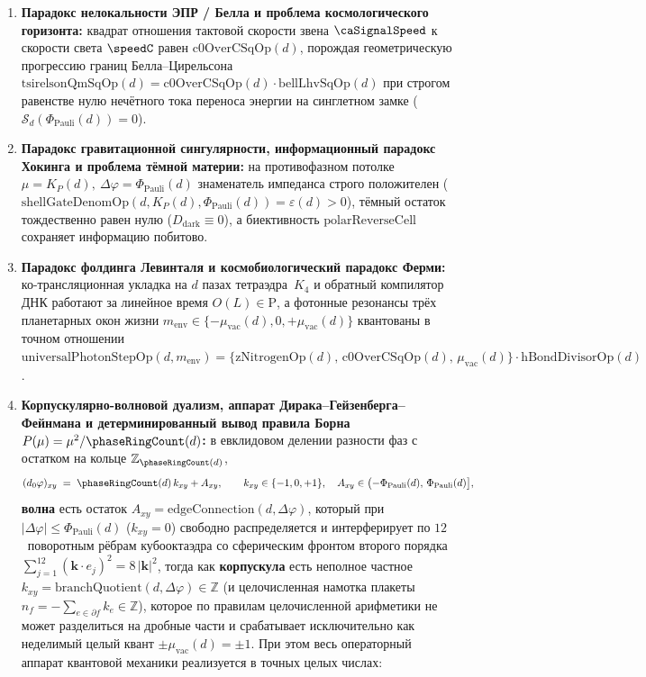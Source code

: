 \begin{theorem}
\begin{enumerate}[label=\textbf{(\roman*)},leftmargin=*]
\item \textbf{Парадокс нелокальности ЭПР / Белла и проблема космологического горизонта:}
  квадрат отношения тактовой скорости звена $\caSignalSpeed$ к скорости света $\speedC$ равен $\mathrm{c0OverCSqOp}(d)$, порождая геометрическую прогрессию границ Белла--Цирельсона $\mathrm{tsirelsonQmSqOp}(d) = \mathrm{c0OverCSqOp}(d)\cdot\mathrm{bellLhvSqOp}(d)$ при строгом равенстве нулю нечётного тока переноса энергии на синглетном замке ($\mathcal{S}_d(\Phi_{\mathrm{Pauli}}(d)) = 0$).
\item \textbf{Парадокс гравитационной сингулярности, информационный парадокс Хокинга и проблема тёмной материи:}
  на противофазном потолке $\mu=K_P(d),\ \Delta\varphi=\Phi_{\mathrm{Pauli}}(d)$ знаменатель импеданса строго положителен ($\mathrm{shellGateDenomOp}(d,K_P(d),\Phi_{\mathrm{Pauli}}(d)) = \varepsilon(d) > 0$), тёмный остаток тождественно равен нулю ($D_{\mathrm{dark}}\equiv 0$), а биективность $\mathrm{polarReverseCell}$ сохраняет информацию побитово.
\item \textbf{Парадокс фолдинга Левинталя и космобиологический парадокс Ферми:}
  ко-трансляционная укладка на $d$ пазах тетраэдра~$K_4$ и обратный компилятор ДНК работают за линейное время $O(L)\in\mathrm{P}$, а фотонные резонансы трёх планетарных окон жизни $m_{\mathrm{env}}\in\{-\mu_{\mathrm{vac}}(d),0,+\mu_{\mathrm{vac}}(d)\}$ квантованы в точном отношении $\mathrm{universalPhotonStepOp}(d,m_{\mathrm{env}}) = \{\mathrm{zNitrogenOp}(d),\,\mathrm{c0OverCSqOp}(d),\,\mu_{\mathrm{vac}}(d)\}\cdot\mathrm{hBondDivisorOp}(d)$.
\item \textbf{Корпускулярно-волновой дуализм, аппарат Дирака--Гейзенберга--Фейнмана и детерминированный вывод правила Борна $P(\mu)=\mu^2/\phaseRingCount(d)$:}
  в евклидовом делении разности фаз с остатком на кольце $\mathbb{Z}_{\phaseRingCount(d)}$,
  \[
    (d_0\varphi)_{xy} \;=\; \phaseRingCount(d)\,k_{xy} + A_{xy},\qquad
    k_{xy}\in\{-1,0,+1\},\quad A_{xy}\in\bigl(-\Phi_{\mathrm{Pauli}}(d),\,\Phi_{\mathrm{Pauli}}(d)\bigr],
  \]
  \textbf{волна} есть остаток $A_{xy} = \mathrm{edgeConnection}(d,\Delta\varphi)$, который при $|\Delta\varphi|\le\Phi_{\mathrm{Pauli}}(d)$ ($k_{xy}=0$) свободно распределяется и интерферирует по $12$~поворотным рёбрам кубооктаэдра со сферическим фронтом второго порядка $\sum_{j=1}^{12}(\mathbf{k}\cdot e_j)^2 = 8\,|\mathbf{k}|^2$, тогда как \textbf{корпускула} есть неполное частное $k_{xy} = \mathrm{branchQuotient}(d,\Delta\varphi)\in\mathbb{Z}$ (и целочисленная намотка плакеты $n_f = -\sum_{e\in\partial f} k_e\in\mathbb{Z}$), которое по правилам целочисленной арифметики не может разделиться на дробные части и срабатывает исключительно как неделимый целый квант $\pm\mu_{\mathrm{vac}}(d) = \pm 1$. При этом весь операторный аппарат квантовой механики реализуется в точных целых числах:

\end{enumerate}
\end{theorem}
